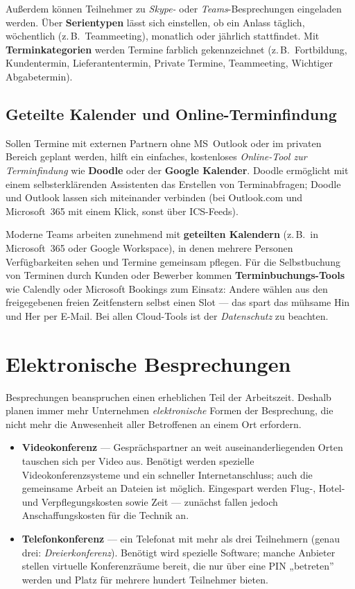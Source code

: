 \documentclass[11pt, a4paper]{article}
\begin{document}
Außerdem können Teilnehmer zu \emph{Skype-} oder \emph{Teams}-Besprechungen eingeladen
werden. Über \textbf{Serientypen} lässt sich einstellen, ob ein Anlass täglich,
wöchentlich (z.\,B.\ Teammeeting), monatlich oder jährlich stattfindet. Mit
\textbf{Terminkategorien} werden Termine farblich gekennzeichnet (z.\,B.\ Fortbildung,
Kundentermin, Lieferantentermin, Private Termine, Teammeeting, Wichtiger Abgabetermin).

\subsection{Geteilte Kalender und Online-Terminfindung}

Sollen Termine mit externen Partnern ohne MS~Outlook oder im privaten Bereich geplant
werden, hilft ein einfaches, kostenloses \emph{Online-Tool zur Terminfindung} wie
\textbf{Doodle} oder der \textbf{Google Kalender}. Doodle ermöglicht mit einem
selbsterklärenden Assistenten das Erstellen von Terminabfragen; Doodle und Outlook
lassen sich miteinander verbinden (bei Outlook.com und Microsoft~365 mit einem Klick,
sonst über ICS-Feeds).

Moderne Teams arbeiten zunehmend mit \textbf{geteilten Kalendern} (z.\,B.\ in
Microsoft~365 oder Google Workspace), in denen mehrere Personen Verfügbarkeiten sehen
und Termine gemeinsam pflegen. Für die Selbstbuchung von Terminen durch Kunden oder
Bewerber kommen \textbf{Terminbuchungs-Tools} wie Calendly oder Microsoft Bookings zum
Einsatz: Andere wählen aus den freigegebenen freien Zeitfenstern selbst einen Slot ---
das spart das mühsame Hin und Her per E-Mail. Bei allen Cloud-Tools ist der
\emph{Datenschutz} zu beachten.

\section{Elektronische Besprechungen}

Besprechungen beanspruchen einen erheblichen Teil der Arbeitszeit. Deshalb planen immer
mehr Unternehmen \emph{elektronische} Formen der Besprechung, die nicht mehr die
Anwesenheit aller Betroffenen an einem Ort erfordern.

\begin{itemize}
  \item \textbf{Videokonferenz} --- Gesprächspartner an weit auseinanderliegenden Orten
    tauschen sich per Video aus. Benötigt werden spezielle Videokonferenzsysteme und ein
    schneller Internetanschluss; auch die gemeinsame Arbeit an Dateien ist möglich.
    Eingespart werden Flug-, Hotel- und Verpflegungskosten sowie Zeit --- zunächst fallen
    jedoch Anschaffungskosten für die Technik an.
  \item \textbf{Telefonkonferenz} --- ein Telefonat mit mehr als drei Teilnehmern (genau
    drei: \emph{Dreierkonferenz}). Benötigt wird spezielle Software; manche Anbieter
    stellen virtuelle Konferenzräume bereit, die nur über eine PIN „betreten” werden und
    Platz für mehrere hundert Teilnehmer bieten.
\end{itemize}
\end{document}
